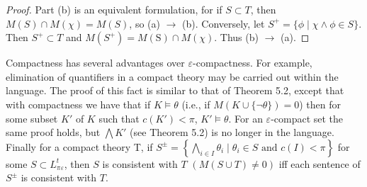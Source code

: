 \documentclass{article}
\begin{document}
{{{\begin{proof}
Part (b) is an equivalent formulation, for if $S \subset T$, then $M(S) \cap M(\chi)=M(S)$, so (a) $\rightarrow$ (b). Conversely, let $S^{+}=\{\phi \mid \chi \wedge \phi \in S\}$. Then $S^{+} \subset T$ and $M\left(S^{+}\right)=M(\mathrm{S}) \cap M(\chi)$. Thus (b) $\rightarrow$ (a).
\end{proof}
Compactness has several advantages over $\varepsilon$-compactness. For example, elimination of quantifiers in a compact theory may be carried out within the language. The proof of this fact is similar to that of Theorem 5.2, except that with compactness we have that if $K \vDash \theta$ (i.e., if $M(K \cup\{\neg \theta\})=0$) then for some subset $K'$ of $K$ such that $c\left(K'\right)<\pi$, $K' \vDash \theta$. For an $\varepsilon$-compact set the same proof holds, but $\bigwedge K'$ (see Theorem 5.2) is no longer in the language. Finally for a compact theory T, if $S^{ \pm}=\left\{\bigwedge_{i \in I} \theta_{i} \mid \theta_{i} \in S \text{ and } c(I)<\pi\right\}$ for some $S \subset L_{\pi \varepsilon}^{t}$, then $S$ is consistent with $T$ $(M(S \cup T) \neq 0)$ iff each sentence of $S^{ \pm}$ is consistent with $T$.
}}}
\end{document}
